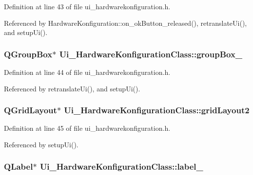 Definition at line 43 of file ui\_\-hardwarekonfiguration.h.

Referenced by HardwareKonfiguration::on\_\-okButton\_\-released(), retranslateUi(), and setupUi().\hypertarget{class_ui___hardware_konfiguration_class_99b6adc09321ce48551fcf4ef623aec5}{
\subsubsection[groupBox\_\-3]{\setlength{\rightskip}{0pt plus 5cm}QGroupBox$\ast$ {\bf Ui\_\-HardwareKonfigurationClass::groupBox\_}}}
\label{class_ui___hardware_konfiguration_class_99b6adc09321ce48551fcf4ef623aec5}




Definition at line 44 of file ui\_\-hardwarekonfiguration.h.

Referenced by retranslateUi(), and setupUi().\hypertarget{class_ui___hardware_konfiguration_class_73a4a8b67ed70c1ea98f4141a010b034}{
\subsubsection[gridLayout2]{\setlength{\rightskip}{0pt plus 5cm}QGridLayout$\ast$ {\bf Ui\_\-HardwareKonfigurationClass::gridLayout2}}}
\label{class_ui___hardware_konfiguration_class_73a4a8b67ed70c1ea98f4141a010b034}




Definition at line 45 of file ui\_\-hardwarekonfiguration.h.

Referenced by setupUi().\hypertarget{class_ui___hardware_konfiguration_class_495a69b871217df346fb62fe64da1927}{
\subsubsection[label\_\-3]{\setlength{\rightskip}{0pt plus 5cm}QLabel$\ast$ {\bf Ui\_\-HardwareKonfigurationClass::label\_}}}
\label{class_ui___hardware_konfiguration_class_495a69b871217df346fb62fe64da1927}




